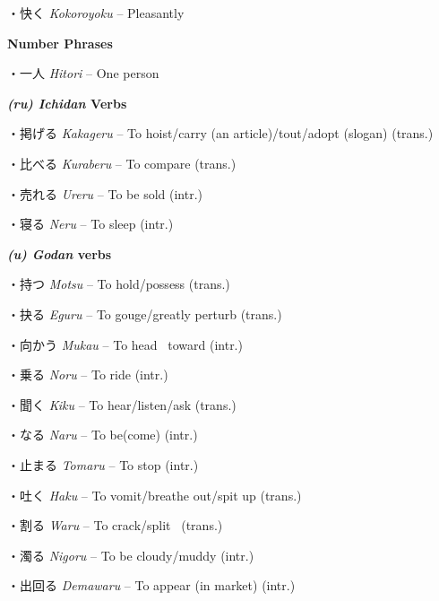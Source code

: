 \par{・快く \emph{Kokoroyoku }– Pleasantly }

\par{\textbf{Number Phrases }}

\par{・一人 \emph{Hitori }– One person }

\par{\textbf{\emph{(ru) Ichidan }Verbs }}

\par{・掲げる \emph{Kakageru }– To hoist\slash carry (an article)\slash tout\slash adopt (slogan) (trans.) }

\par{・比べる \emph{Kuraberu }– To compare (trans.) }

\par{・売れる \emph{Ureru }– To be sold (intr.) }

\par{・寝る \emph{Neru }– To sleep (intr.) }

\par{\textbf{\emph{(u) Godan }verbs }}

\par{・持つ \emph{Motsu }– To hold\slash possess (trans.) }

\par{・抉る \emph{Eguru }– To gouge\slash greatly perturb (trans.) }

\par{・向かう \emph{Mukau }– To head  toward (intr.) }

\par{・乗る \emph{Noru }– To ride (intr.) }

\par{・聞く \emph{Kiku }– To hear\slash listen\slash ask (trans.) }

\par{・なる \emph{Naru }– To be(come) (intr.) }

\par{・止まる \emph{Tomaru }– To stop (intr.) }

\par{・吐く \emph{Haku }– To vomit\slash breathe out\slash spit up (trans.) }

\par{・割る \emph{Waru }– To crack\slash split  (trans.) }

\par{・濁る \emph{Nigoru }– To be cloudy\slash muddy (intr.) }

\par{・出回る \emph{Demawaru }– To appear (in market) (intr.) }

